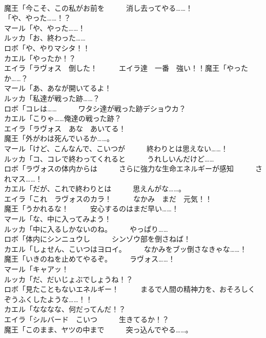 \documentclass[8pt]{extreport}
\begin{document}
\begin{CJK}{UTF8}{min}
\\	魔王「今こそ、この私がお前を　　　消し去ってやる……！	
\\	「や、やった……！？	
\\	マール「や、やった……！	
\\	ルッカ「お、終わった……	
\\	ロボ「や、やりマシタ！！	
\\	カエル「やったか！？	
\\	エイラ「ラヴォス　倒した！　　　エイラ達　一番　強い！！魔王「やったか……？	
\\	マール「あ、あなが開いてるよ！	
\\	ルッカ「私達が戦った跡……？	
\\	ロボ「コレは……　　　ワタシ達が戦った跡デショウカ？	
\\	カエル「こりゃ……俺達の戦った跡？	
\\	エイラ「ラヴォス　あな　あいてる！	
\\	魔王「外がわは死んでいるか……。	
\\	マール「けど、こんなんで、こいつが　　　終わりとは思えない……！	
\\	ルッカ「コ、コレで終わってくれると　　　うれしいんだけど……	
\\	ロボ「ラヴォスの体内からは　　　さらに強力な生命エネルギーが感知　　　されマス……！	
\\	カエル「だが、これで終わりとは　　　思えんがな……。	
\\	エイラ「これ　ラヴォスのカラ！　　　なかみ　まだ　元気！！	
\\	魔王「うかれるな！　　　安心するのはまだ早い……！	
\\	マール「な、中に入ってみよう！	
\\	ルッカ「中に入るしかないのね。　　　やっぱり……	
\\	ロボ「体内にシンニュウし　　　シンゾウ部を倒さねば！	
\\	カエル「しょせん、こいつはヨロイ。　　　なかみをブッ倒さなきゃな……！	
\\	魔王「いきのねを止めてやるぞ。　　　ラヴォス……！	
\\	マール「キャアッ！	
\\	ルッカ「だ、だいじょぶでしょうね！？	
\\	ロボ「見たこともないエネルギー！　　　まるで人間の精神力を、おそろしく　　　ぞうふくしたような……！！	
\\	カエル「なななな、何だってんだ！？	
\\	エイラ「シルバード　こいつ　　　生きてるか！？	
\\	魔王「このまま、ヤツの中まで　　　突っ込んでやる……。	

\end{CJK}
\end{document}
